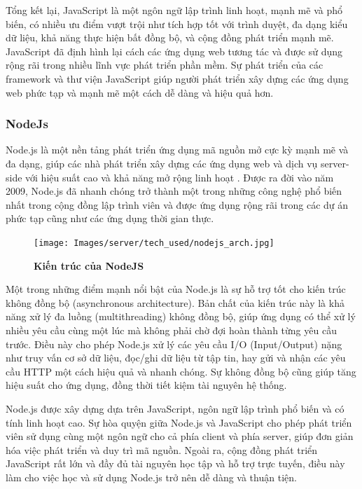 Tổng kết lại, JavaScript là một ngôn ngữ lập trình linh hoạt, mạnh mẽ và phổ biến, có nhiều ưu điểm vượt trội như tích hợp tốt với trình duyệt, đa dạng kiểu dữ liệu, khả năng thực hiện bất đồng bộ, và cộng đồng phát triển mạnh mẽ. JavaScript đã định hình lại cách các ứng dụng web tương tác và được sử dụng rộng rãi trong nhiều lĩnh vực phát triển phần mềm. Sự phát triển của các framework và thư viện JavaScript giúp người phát triển xây dựng các ứng dụng web phức tạp và mạnh mẽ một cách dễ dàng và hiệu quả hơn.




\subsubsection{NodeJs}
\mbox{}

Node.js là một nền tảng phát triển ứng dụng mã nguồn mở cực kỳ mạnh mẽ và đa dạng, giúp các nhà phát triển xây dựng các ứng dụng web và dịch vụ server-side với hiệu suất cao và khả năng mở rộng linh hoạt \cite{nodejs_1}. Được ra đời vào năm 2009, Node.js đã nhanh chóng trở thành một trong những công nghệ phổ biến nhất trong cộng đồng lập trình viên và được ứng dụng rộng rãi trong các dự án phức tạp cũng như các ứng dụng thời gian thực. 

\begin{figure}[H]
  \centering
  \texttt{[image: Images/server/tech\_used/nodejs\_arch.jpg]}
  \caption[Kiến trúc của NodeJS]{\bfseries \fontsize{12pt}{0pt}
  \selectfont Kiến trúc của NodeJS}
  \label{ble_services} %
\end{figure}

Một trong những điểm mạnh nổi bật của Node.js là sự hỗ trợ tốt cho kiến trúc không đồng bộ (asynchronous architecture). Bản chất của kiến trúc này là khả năng xử lý đa luồng (multithreading) không đồng bộ, giúp ứng dụng có thể xử lý nhiều yêu cầu cùng một lúc mà không phải chờ đợi hoàn thành từng yêu cầu trước. Điều này cho phép Node.js xử lý các yêu cầu I/O (Input/Output) nặng như truy vấn cơ sở dữ liệu, đọc/ghi dữ liệu từ tập tin, hay gửi và nhận các yêu cầu HTTP một cách hiệu quả và nhanh chóng. Sự không đồng bộ cũng giúp tăng hiệu suất cho ứng dụng, đồng thời tiết kiệm tài nguyên hệ thống.

Node.js được xây dựng dựa trên JavaScript, ngôn ngữ lập trình phổ biến và có tính linh hoạt cao. Sự hòa quyện giữa Node.js và JavaScript cho phép phát triển viên sử dụng cùng một ngôn ngữ cho cả phía client và phía server, giúp đơn giản hóa việc phát triển và duy trì mã nguồn. Ngoài ra, cộng đồng phát triển JavaScript rất lớn và đầy đủ tài nguyên học tập và hỗ trợ trực tuyến, điều này làm cho việc học và sử dụng Node.js trở nên dễ dàng và thuận tiện.

